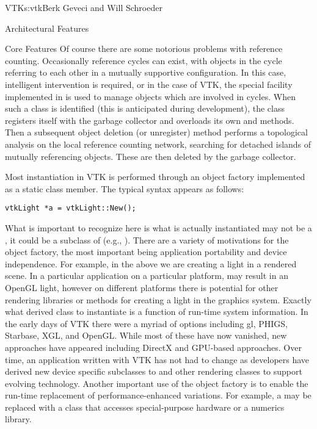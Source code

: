 \begin{aosachapter}{VTK}{s:vtk}{Berk Geveci and Will Schroeder}
\begin{aosasect1}{Architectural Features}
\begin{aosasect2}{Core Features}
Of course there are some notorious problems with reference
counting. Occasionally reference cycles can exist, with objects in the
cycle referring to each other in a mutually supportive
configuration. In this case, intelligent intervention is required, or
in the case of VTK, the special facility implemented in
 is used to manage objects which are
involved in cycles. When such a class is identified (this is
anticipated during development), the class registers itself with the
garbage collector and overloads its own  and
 methods. Then a subsequent object deletion (or
unregister) method performs a topological analysis on the local
reference counting network, searching for detached islands of mutually
referencing objects. These are then deleted by the garbage collector.

Most instantiation in VTK is performed through an object factory
implemented as a static class member. The typical syntax appears as
follows:

\begin{verbatim}
vtkLight *a = vtkLight::New();
\end{verbatim}

What is important to recognize here is what is actually instantiated
may not be a , it could be a subclass of
 (e.g., ). There are a variety of
motivations for the object factory, the most important being
application portability and device independence. For example, in the
above we are creating a light in a rendered scene. In a particular
application on a particular platform,  may result
in an OpenGL light, however on different platforms there is potential
for other rendering libraries or methods for creating a light in the
graphics system. Exactly what derived class to instantiate is a
function of run-time system information. In the early days of VTK
there were a myriad of options including gl, PHIGS, Starbase, XGL, and
OpenGL\@. While most of these have now vanished, new approaches have
appeared including DirectX and GPU-based approaches. Over time, an
application written with VTK has not had to change as developers have
derived new device specific subclasses to  and other
rendering classes to support evolving technology. Another important
use of the object factory is to enable the run-time replacement of
performance-enhanced variations. For example, a  may
be replaced with a class that accesses special-purpose hardware or a
numerics library.


\end{aosasect2}
\end{aosasect1}
\end{aosachapter}
